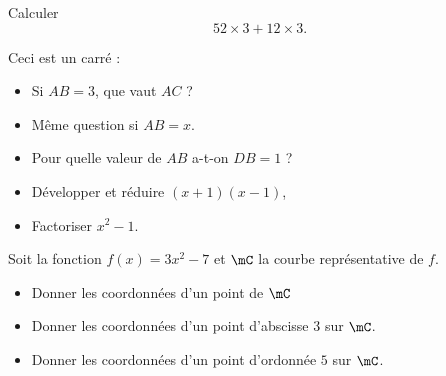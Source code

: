 \begin{MentalActivity}

\begin{mental}
    
            Calculer
            \begin{equation*}
                52\times 3+12\times 3.
            \end{equation*}

\end{mental}

\begin{mental}
        Ceci est un carré :

        \begin{center}
   
        \end{center}

        \begin{itemize}
            \item Si \( AB=3\), que vaut \( AC\) ?
            \item Même question si \( AB=x\).
            \item Pour quelle valeur de \( AB\) a-t-on \( DB=1\) ?
        \end{itemize}
\end{mental}

\begin{mental}
        \begin{itemize}
            \item
    Développer et réduire $(x+1)(x-1)$, 
\item
    Factoriser $x^2-1$.
        \end{itemize}
\end{mental}


\begin{mental}
            Soit la fonction \( f(x)=3x^2-7\) et \( \mC\) la courbe représentative de \( f\).
            \begin{itemize}
            \item Donner les coordonnées d'un point de \( \mC\)
            \item Donner les coordonnées d'un point d'abscisse \( 3\) sur \( \mC\).
            \item Donner les coordonnées d'un point d'ordonnée \( 5\) sur \( \mC\).
            \end{itemize}
\end{mental}

\end{MentalActivity}


